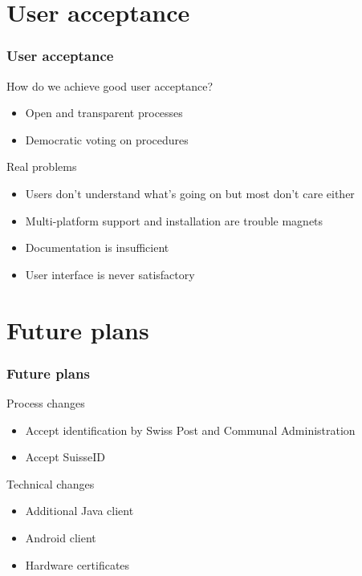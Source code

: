 \documentclass[aspectratio=1610, compress, bigger]{beamer}
\begin{document}
\section{User acceptance}
\begin{frame}\frametitle{User acceptance}

\begin{block}{How do we achieve good user acceptance?}
\begin{itemize}
\item Open and transparent processes
\item Democratic voting on procedures
\end{itemize}
\end{block}

\pause

\begin{alertblock}{Real problems}
\begin{itemize}
\item Users don't understand what's going on but most don't care either
\item Multi-platform support and installation are trouble magnets
\item Documentation is insufficient
\item User interface is never satisfactory
\end{itemize}
\end{alertblock}

\end{frame}

\section{Future plans}
\begin{frame}\frametitle{Future plans}

\begin{block}{Process changes}
\begin{itemize}
\item Accept identification by Swiss Post and Communal Administration
\item Accept SuisseID
\end{itemize}
\end{block}

\pause

\begin{block}{Technical changes}
\begin{itemize}
\item Additional Java client
\item Android client
\item Hardware certificates
\end{itemize}
\end{block}

\end{frame}
\end{document}

